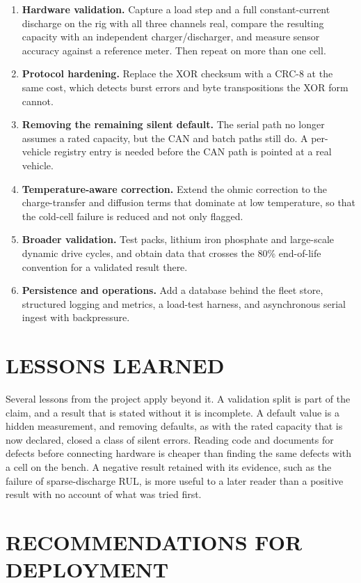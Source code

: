 \begin{enumerate}
    \item \textbf{Hardware validation.} Capture a load step and a full constant-current discharge on the rig with all three channels real, compare the resulting capacity with an independent charger/discharger, and measure sensor accuracy against a reference meter. Then repeat on more than one cell.
    \item \textbf{Protocol hardening.} Replace the XOR checksum with a CRC-8 at the same cost, which detects burst errors and byte transpositions the XOR form cannot.
    \item \textbf{Removing the remaining silent default.} The serial path no longer assumes a rated capacity, but the CAN and batch paths still do. A per-vehicle registry entry is needed before the CAN path is pointed at a real vehicle.
    \item \textbf{Temperature-aware correction.} Extend the ohmic correction to the charge-transfer and diffusion terms that dominate at low temperature, so that the cold-cell failure is reduced and not only flagged.
    \item \textbf{Broader validation.} Test packs, lithium iron phosphate and large-scale dynamic drive cycles, and obtain data that crosses the 80\% end-of-life convention for a validated result there.
    \item \textbf{Persistence and operations.} Add a database behind the fleet store, structured logging and metrics, a load-test harness, and asynchronous serial ingest with backpressure.
\end{enumerate}

\section{LESSONS LEARNED}

Several lessons from the project apply beyond it. A validation split is part of the claim, and a result that is stated without it is incomplete. A default value is a hidden measurement, and removing defaults, as with the rated capacity that is now declared, closed a class of silent errors. Reading code and documents for defects before connecting hardware is cheaper than finding the same defects with a cell on the bench. A negative result retained with its evidence, such as the failure of sparse-discharge RUL, is more useful to a later reader than a positive result with no account of what was tried first.

\section{RECOMMENDATIONS FOR DEPLOYMENT}


